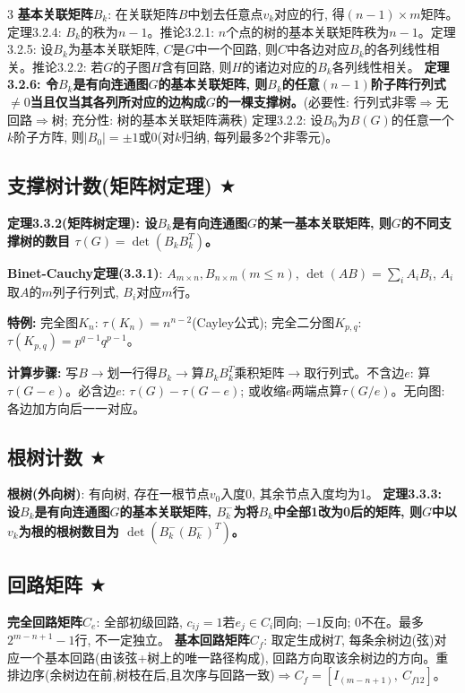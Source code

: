 \documentclass[4.5pt,landscape]{extarticle}
\newcommand{\rd}[1]{\textcolor{rd}{\textbf{#1}}}
\newcommand{\xt}[1]{\textbf{#1}}
\begin{document}
\begin{multicols*}{3}
\xt{基本关联矩阵$B_k$}: 在关联矩阵$B$中划去任意点$v_k$对应的行, 得$(n-1)\times m$矩阵。定理3.2.4: $B_k$的秩为$n-1$。推论3.2.1: $n$个点的树的基本关联矩阵秩为$n-1$。定理3.2.5: 设$B_k$为基本关联矩阵, $C$是$G$中一个回路, 则$C$中各边对应$B_k$的各列线性相关。推论3.2.2: 若$G$的子图$H$含有回路, 则$H$的诸边对应的$B_k$各列线性相关。
\rd{定理3.2.6: 令$B_k$是有向连通图$G$的基本关联矩阵, 则$B_k$的任意$(n-1)$阶子阵行列式$\neq0$当且仅当其各列所对应的边构成$G$的一棵支撑树。}(必要性: 行列式非零$\Rightarrow$无回路$\Rightarrow$树; 充分性: 树的基本关联矩阵满秩)
定理3.2.2: 设$B_0$为$B(G)$的任意一个$k$阶子方阵, 则$|B_0|=\pm1$或$0$(对$k$归纳, 每列最多2个非零元)。

\subsection{支撑树计数(矩阵树定理) $\bigstar$}
\rd{定理3.3.2(矩阵树定理): 设$B_k$是有向连通图$G$的某一基本关联矩阵, 则$G$的不同支撑树的数目 $\tau(G)=\det(B_k B_k^T)$。}

\xt{Binet-Cauchy定理(3.3.1)}: $A_{m\times n},B_{n\times m}(m\leq n)$, $\det(AB)=\sum_i A_iB_i$, $A_i$取$A$的$m$列子行列式, $B_i$对应$m$行。

\xt{特例:} 完全图$K_n$: $\tau(K_n)=n^{n-2}$(Cayley公式); 完全二分图$K_{p,q}$: $\tau(K_{p,q})=p^{q-1}q^{p-1}$。

\xt{计算步骤:} 写$B\to$划一行得$B_k\to$算$B_kB_k^T$乘积矩阵$\to$取行列式。不含边$e$: 算$\tau(G-e)$。必含边$e$: $\tau(G)-\tau(G-e)$; 或收缩$e$两端点算$\tau(G/e)$。无向图: 各边加方向后一一对应。


\subsection{根树计数 $\bigstar$}
\xt{根树(外向树)}: 有向树, 存在一根节点$v_0$入度0, 其余节点入度均为1。
\rd{定理3.3.3: 设$B_k$是有向连通图$G$的基本关联矩阵, $B_k^-$为将$B_k$中全部1改为0后的矩阵, 则$G$中以$v_k$为根的根树数目为 $\det(B_k^-(B_k^-)^T)$。}


\subsection{回路矩阵 $\bigstar$}
\xt{完全回路矩阵$C_e$}: 全部初级回路, $c_{ij}=1$若$e_j\in C_i$同向; $-1$反向; $0$不在。最多$2^{m-n+1}-1$行, 不一定独立。
\xt{基本回路矩阵$C_f$}: 取定生成树$T$, 每条余树边(弦)对应一个基本回路(由该弦+树上的唯一路径构成), 回路方向取该余树边的方向。重排边序(余树边在前,树枝在后,且次序与回路一致)$\Rightarrow C_f=[I_{(m-n+1)},\ C_{f12}]$。


\end{multicols*}
\end{document}
